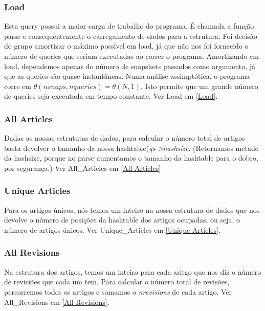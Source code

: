 \documentclass{article}
\begin{document}
\subsubsection{Load}
\par Esta query possui a maior carga de trabalho do programa. É chamada a função parse e consequentemente o carregamento de dados para a estrutura. Foi decisão do grupo amortizar o máximo possível em load, já que não nos foi fornecido o número de queries que seriam executadas ao correr o programa. Amortizando em load, dependemos apenas do número de snapshots passados como argumento, já que as queries são quase instantâneas. Numa análise assimptótica, o programa corre em $\theta(nsnaps, nqueries) = \theta(N, 1).$ Isto permite que um grande número de queries seja executada em tempo constante. Ver Load em \ref{Load}.

\subsubsection{All Articles}
\par Dadas as nossas estrututas de dados, para calcular o número total de artigos basta devolver o tamanho da nossa hashtable(\emph{qs->hashsize}. (Retornamos metade da hashsize, porque no parse aumentamos o tamanho da hashtable para o dobro, por segurança.) Ver All\_Articles em \ref{All Articles}

\subsubsection{Unique Articles}
\par Para os artigos únicos, nós temos um inteiro na nossa estrutura de dados que nos devolve o número de posições da hashtable dos artigos ocupadas, ou seja, o número de artigos únicos. Ver Unique\_Articles em \ref{Unique Articles}.

\subsubsection{All Revisions}
\par Na estrutura dos artigos, temos um inteiro para cada aritgo que nos diz o número de revisiões que cada um tem. Para calcular o número total de revisões, percorremos todos os artigos e somamos o \emph{nrevisions} de cada artigo. Ver All\_Revisions em \ref{All Revisions}.
\end{document}
